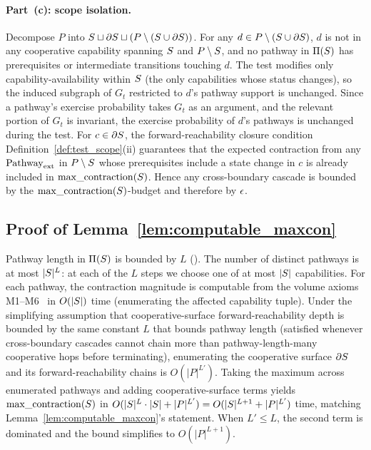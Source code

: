 \paragraph{Part~(c): scope isolation.}
Decompose $P$ into
$S \sqcup \partial S \sqcup (P \setminus (S \cup
\partial S))$.  For any $d \in P \setminus (S \cup
\partial S)$, $d$ is not in any cooperative capability
spanning $S$ and $P \setminus S$, and no pathway in
$\Pi(S)$ has prerequisites or intermediate transitions
touching $d$.  The test modifies only capability-availability
within $S$ (the only capabilities whose status changes),
so the induced subgraph of $G_t$ restricted to $d$'s pathway
support is unchanged.  Since a pathway's exercise probability
\citep[Definition~2]{lasser2026horizon} takes $G_t$ as an
argument, and the relevant portion of $G_t$ is invariant, the
exercise probability of $d$'s pathways is unchanged during
the test.  For
$c \in \partial S$, the forward-reachability closure
condition Definition~\ref{def:test_scope}(ii) guarantees that
the expected contraction from any $\mathrm{Pathway}_{\mathrm{ext}}$ in
$P \setminus S$ whose prerequisites include a state
change in $c$ is already included in $\mathrm{max\_contraction}(S)$.  Hence
any cross-boundary cascade is bounded by the
$\mathrm{max\_contraction}(S)$-budget and therefore by $\epsilon$.

\subsection{Proof of Lemma~\ref{lem:computable_maxcon}}

Pathway length in $\Pi(S)$ is bounded by $L$
(\citep[Definition~2]{lasser2026horizon}).  The number of
distinct pathways is at most $|S|^L$: at each of the $L$
steps we choose one of at most $|S|$ capabilities.  For
each pathway, the contraction magnitude is computable from the
volume axioms M1--M6~\citep[Proposition~1]{lasser2026poset}
in $O(|S|)$ time (enumerating the affected capability
tuple).  Under the simplifying assumption that
cooperative-surface forward-reachability depth is bounded by
the same constant $L$ that bounds pathway length (satisfied
whenever cross-boundary cascades cannot chain more than
pathway-length-many cooperative hops before terminating),
enumerating the cooperative surface $\partial S$ and its
forward-reachability chains is $O(|P|^{L'})$.  Taking the
maximum across enumerated pathways and adding
cooperative-surface terms yields $\mathrm{max\_contraction}(S)$ in
$O(|S|^L \cdot |S| + |P|^{L'}) = O(|S|^{L+1}
+ |P|^{L'})$ time, matching Lemma~\ref{lem:computable_maxcon}'s
statement.  When $L' \leq L$, the second term is dominated and
the bound simplifies to $O(|P|^{L+1})$.

